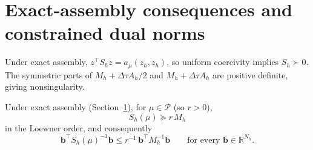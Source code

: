 \documentclass[supplement,hidelinks]{siamart251216}
\newcommand{\R}{\mathbb{R}}
\newcommand{\Pset}{\mathcal{P}}
\newcommand{\Mh}{M_h}
\newcommand{\Ah}{A_h}
\newcommand{\Sh}{S_h}
\newcommand{\dt}{\Delta\tau}
\newcommand{\bb}{\mathbf b}
\newcommand{\rf}{r}
\begin{document}
\section{Exact-assembly consequences and constrained dual norms}
\label{ssec:exact-assembly}
Under exact assembly, $z^\top\Sh z=a_\mu(z_h,z_h)$, so uniform coercivity
implies $\Sh\succ0$. The symmetric parts of $\Mh+\dt\Ah/2$ and
$\Mh+\dt\Ah$ are positive definite, giving nonsingularity.
\begin{lemma}
\label{lem:mass-lower}
Under exact assembly (Section~\ref{ssec:exact-assembly}), for
$\mu\in\Pset$ (so $\rf>0$),
\begin{equation}
  \Sh(\mu)\succeq \rf\,\Mh
  \label{eq:S-ge-rM}
\end{equation}
in the Loewner order, and consequently
\begin{equation}
  \bb^\top\Sh(\mu)^{-1}\bb\le \rf^{-1}\,\bb^\top\Mh^{-1}\bb
  \qquad\text{for every }\bb\in\R^{N_h}.
  \label{eq:mass-upper}
\end{equation}
\end{lemma}
\end{document}
